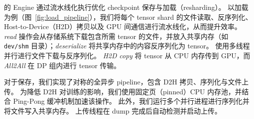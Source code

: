 \sys{} 的 Engine 通过流水线化执行优化 checkpoint 保存与加载（resharding）。
以加载为例（图~\ref{fig:load_pipeline}），我们将每个 tensor shard 的文件读取、反序列化、Host-to-Device（H2D）拷贝以及 GPU 间通信进行流水线化，从而提升效率。
\textit{read} 操作会从存储系统下载包含所需 tensor 的文件，并放入共享内存（如 \texttt{dev/shm} 目录）；\textit{deserialize} 将共享内存中的内容反序列化为 tensor。
\sys{} 使用多线程并行进行文件下载与反序列化。
\textit{H2D copy} 将 tensor 从 CPU 内存传到 GPU，而 \textit{All2All} 在 DP 组内进行 tensor 传输。

对于保存，我们实现了对称的全异步 pipeline，包含 D2H 拷贝、序列化与文件上传。
为降低 D2H 对训练的影响，我们使用固定页（pinned）CPU 内存池，并结合 Ping-Pong 缓冲机制加速该操作。
此外，我们运行多个并行进程进行序列化并将文件写入共享内存。
上传线程在 dump 完成后自动检测并启动上传。

